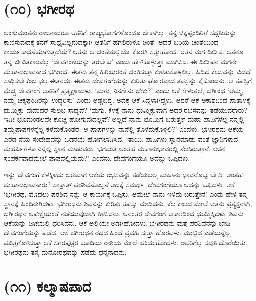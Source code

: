 \section{(೧೦) ಭಗೀರಥ}

ಅಂಶುಮಂತನು ರಾಜನಾದರೂ ಆತನಿಗೆ ರಾಜ್ಯಭೋಗಗಳೊಂದೂ ಬೇಕಾಗಿಲ್ಲ. ತನ್ನ ಚಿಕ್ಕಪ್ಪಂದಿರಿಗೆ ಸದ್ಗತಿಯನ್ನು ಕಾಣಿಸುವುದಕ್ಕೆ ತನಗೆ ಸಾಧ್ಯವಿಲ್ಲದುದಕ್ಕಾಗಿ ಆತನಿಗೆ ಹಗಲಿರುಳೂ ಚಿಂತೆ. ಆದರೆ ಬರಿಯ ಚಿಂತೆಯಿಂದ ಕಾರ್ಯಸಾಧನೆಯಾಗುತ್ತದೆಯೆ? ಆತನು ಆ ಚಿಂತೆಯಲ್ಲಿಯೇ ಕೊರಗಿ ಸತ್ತುಹೋದ. ಆತನ ಮಗ ದಿಲೀಪ. ಆತನೂ ತನ್ನ ಜೀವಿತಕಾಲವೆಲ್ಲ ‘ದೇವಗಂಗೆಯನ್ನು ತರಬೇಕು’ ಎಂದು ಹೇಳಿಕೊಳ್ಳುತ್ತಾ ಮುಗಿಸಿದ. ಈ ದಿಲೀಪನ ಮಗನೇ ಮಹಾನುಭಾವನಾದ ಭಗೀರಥ. ಈತನು ತನ್ನ ಹಿರಿಯರಂತೆ ಚಿಂತಿಸುತ್ತಾ ಕುಳಿತುಕೊಳ್ಳಲಿಲ್ಲ. ಹಿಡಿದ ಕೆಲಸವನ್ನು ಬಿಡದೆ ಸಾಧಿಸಬೇಕೆಂಬ ಛಲ ಈತನದು. ಈತನು ದೇವಗಂಗೆಯನ್ನು ಕುರಿತು ಘೋರವಾದ ತಪಸ್ಸನ್ನು ಕೈಕೊಂಡನು. ಆ ತಪಸ್ಸಿಗೆ ಮೆಚ್ಚಿ ದೇವಗಂಗೆ ಆತನಿಗೆ ಪ್ರತ್ಯಕ್ಷಳಾದಳು. ‘ಮಗು, ನಿನಗೇನು ಬೇಕು?’ ಎಂದು ಆಕೆ ಕೇಳುತ್ತಲೆ, ಭಗೀರಥ ‘ಅಮ್ಮ, ನಮ್ಮ ಚಿಕ್ಕಪ್ಪಂದಿರನ್ನು ಉದ್ಧರಿಸು’ ಎಂದು ಅಡ್ಡಬಿದ್ದ. ಅದಕ್ಕೆ ಆಕೆ ಸಿದ್ಧಳಾಗಿದ್ದಳು. ಆದರೆ ಆಕೆ ಆಕಾಶದಿಂದ ಪಾತಾಳಕ್ಕೆ ಧುಮ್ಮಿಕ್ಕು ವುದೆಂದರೆ ಸುಲಭ ಸಾಧ್ಯವೆ? ‘ಮಗು, ಕೆಳಕ್ಕೆ ನಾನು ಧುಮ್ಮಿಕ್ಕುವಾಗ ಅದರ ರಭಸವನ್ನು ತಡೆಯುವರಾರು? ಇಡೀ ಭೂಮಂಡಲವೇ ಕೊಚ್ಚಿ ಹೋಗುವುದಲ್ಲವೆ? ಅಲ್ಲದೆ ನಾನು ಭೂಮಿಗೆ ಬರುತ್ತಲೆ ಮಹಾ ಪಾಪಿಗಳೆಲ್ಲ ನನ್ನಲ್ಲಿ ತಮ್ಮಪಾಪಗಳನ್ನೆಲ್ಲ ಕಳೆದುಕೊಂಡರೆ, ಆ ಪಾಪಗಳನ್ನು ನಾನೆಲ್ಲಿ ತೊಳೆದುಕೊಳ್ಳಲಿ?’ ಎಂದಳು. ಭಗೀರಥನು ಆಕೆಯ ಎರಡ ನೆಯ ಸಂದೇಹವನ್ನು ಒಡನೆಯೆ ಹೋಗಲಾಡಿಸಿದ. ‘ತಾಯಿ, ಪಾಪಿಗಳು ಸ್ನಾನಮಾಡು ವಂತೆ ಜ್ಞಾನಿಗಳಾದ ಮಹರ್ಷಿಗಳೂ ನಿನ್ನಲ್ಲಿ ಸ್ನಾನ ಮಾಡುವರು. ಭಗವಂತ ಅಂತಹ ಮಹಾನುಭಾವರಲ್ಲಿ ನೆಲಸಿರುತ್ತಾನೆ. ಆತನ ಸಂಪರ್ಕವಾದಮೇಲೆ ಪಾಪವೆಲ್ಲಿಯದು?’ ಎಂದನು. ದೇವಗಂಗೆಯೂ ಅದನ್ನು ಒಪ್ಪಿದಳು.

ಇನ್ನು ದೇವಗಂಗೆ ಕೆಳಕ್ಕಿಳಿದು ಬರುವಾಗ ಆಕೆಯ ರಭಸವನ್ನು ತಡೆಯಬಲ್ಲ ಮಹಾನು ಭಾವನೊಬ್ಬ ಬೇಕು. ಅಂತಹ ಮಹಾನುಭಾವನಾರು? ಸಾಕ್ಷಾತ್ ಪರಶಿವನೊಬ್ಬನೆ ಅದಕ್ಕೆ ಸಮರ್ಥ. ದೇವಗಂಗೆಯೂ ಅದನ್ನು ಒಪ್ಪಿದಳು. ಆಕೆ ‘ಭಗೀರಥ, ಮೊದಲು ಪರಶಿವ ನನ್ನು ಆ ಕಾರ್ಯಕ್ಕೆ ಒಪ್ಪಿಸು, ಆಮೇಲೆ ನಾನು ಇಳಿದು ಬರುತ್ತೇನೆ’ ಎಂದು ಹೇಳಿ ತನ್ನ ಸ್ಥಾನಕ್ಕೆ ಹಿಂದಿರುಗಿದಳು. ಭಗೀರಥನು ಶಿವನನ್ನು ಕುರಿತು ತಪಸ್ಸು ಮಾಡಿದನು. ಕೆಲ ಕಾಲದ ಮೇಲೆ ಆತನು ಪ್ರತ್ಯಕ್ಷನಾಗಿ, ಭಗೀರಥನ ಅಪೇಕ್ಷೆಯಂತೆ ನಡೆಯುವುದಾಗಿ ತಿಳಿಸಿದನು. ಅನಂತರ ದೇವಗಂಗೆ ಆಕಾಶದಿಂದ ಧುಮ್ಮಿಕ್ಕಿದಳು. ಶಿವನು ಆಕೆಯನ್ನು ಜಟೆಯಲ್ಲಿ ಧರಿಸಿದನು. ಆಕೆ ಅಲ್ಲಿಯೇ ಅಡಗಿಹೋದಳು. ಭಗೀರಥನು ಮತ್ತೆ ಪರಶಿವನನ್ನು ಬೇಡಿ ದೇವಗಂಗೆಯನ್ನು ಪಡೆದ. ಆಕೆ ಭಗೀರಥನ ರಥದ ಹಿಂದೆ ಪ್ರವಹಿ ಸುತ್ತಾ ಹೊರಟಳು. ಮುಟ್ಟಿದ ಎಡೆಯನ್ನೆಲ್ಲ ಪವಿತ್ರಗೊಳಿಸುತ್ತಾ ಆಕೆ ಸಗರಪುತ್ರರ ಬೂದಿಯ ರಾಶಿಯ ಮೇಲೆ ಹರಿದುಹೋದಳು. ಅವರಿಗೆಲ್ಲ ಸದ್ಗತಿ ದೊರೆಯಿತು. ಭಗೀರಥನು ತನ್ನ ಮನೋರಥವನ್ನು ಪಡೆದು ಧನ್ಯನಾದನು.


\section{(೧೧) ಕಲ್ಮಾಷಪಾದ}


